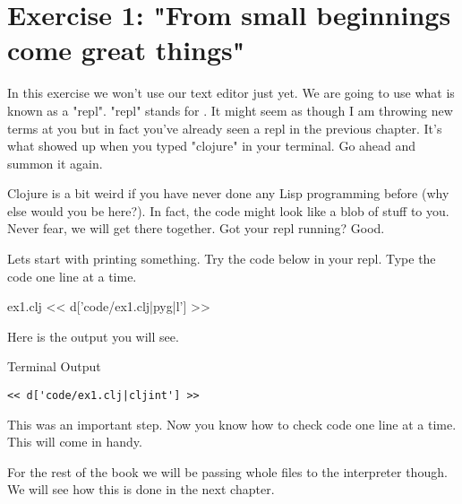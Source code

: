 \chapter{Exercise 1: "From small beginnings come great things"}

In this exercise we won't use our text editor just yet. We are going to use what is known as a "repl". "repl" stands for . It might seem as though I am throwing new terms at you but in fact you've already seen a repl in the previous chapter. It's what showed up when you typed "clojure" in your terminal. Go ahead and summon it again. 

Clojure is a bit weird if you have never done any Lisp programming before (why else would you be here?). In fact, the code might look like a blob of stuff to you. Never fear, we will get there together. Got your repl running? Good.

Lets start with printing something. Try the code below in your repl. Type the code one line at a time.

\begin{code}{ex1.clj}
<< d['code/ex1.clj|pyg|l'] >>
\end{code}

Here is the output you will see.

\begin{code}{Terminal Output}
\begin{Verbatim}
<< d['code/ex1.clj|cljint'] >>
\end{Verbatim}
\end{code}

This was an important step. Now you know how to check code one line at a time.
This will come in handy. 

For the rest of the book we will be passing whole files
to the interpreter though. We will see how this is done in the next chapter.

	

	
	
